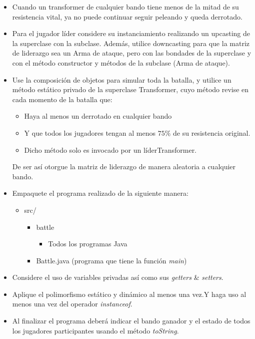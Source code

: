 \documentclass[12pt]{article}
\begin{document}
\begin{enumerate}[label = \arabic{enumi}]
\begin{itemize}
      \item Cuando un transformer de cualquier bando tiene menos de la mitad de su resistencia vital, ya no puede continuar seguir peleando y queda derrotado.
      \item Para el jugador líder considere su instanciamiento realizando un upcasting de la superclase con la subclase. Además, utilice downcasting para que la matriz de liderazgo sea un Arma de ataque, pero con las bondades de la superclase y con el método constructor y métodos de la subclase (Arma de ataque).
      \item Use la composición de objetos para simular toda la batalla, y utilice un método estático privado de la superclase Transformer, cuyo método revise en cada momento de la batalla que:
      \begin{itemize}
        \item Haya al menos un derrotado en cualquier bando
        \item Y que todos los jugadores tengan al menos $75\%$ de su resistencia original.
        \item Dicho método solo es invocado por un líderTransformer.
      \end{itemize}
      De ser así otorgue la matriz de liderazgo de manera aleatoria a cualquier bando.

      \item Empaquete el programa realizado de la siguiente manera:
      \begin{itemize}
        \item src/
        \begin{itemize}
          \item battle
          \begin{itemize}
            \item Todos los programas Java
          \end{itemize}
          \item Battle.java (programa que tiene la función \textit{main})
        \end{itemize}
      \end{itemize}

      \item Considere el uso de variables privadas así como sus \textit{getters} \& \textit{setters}.
      \item Aplique el polimorfismo estático y dinámico al menos una vez.Y haga uso al menos una vez del operador \textit{instanceof}.
      \item Al finalizar el programa deberá indicar el bando ganador y el estado de todos los jugadores participantes usando el método \textit{toString}.
    \end{itemize}


\end{enumerate}
\end{document}
